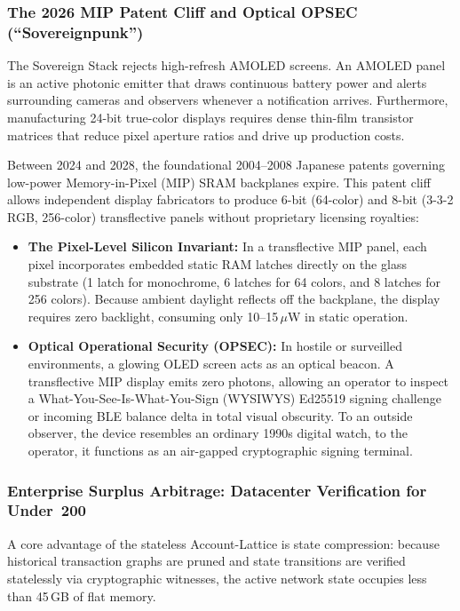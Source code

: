 \documentclass[a4paper,11pt,twoside,parskip=half-,headings=small]{scrartcl}
\newcommand{\EUR}[1]{\texteuro\,#1}
\begin{document}
\subsubsection{The 2026 MIP Patent Cliff and Optical OPSEC (``Sovereignpunk'')}
The Sovereign Stack rejects high-refresh AMOLED screens. An AMOLED panel is an active photonic emitter that draws continuous battery power and alerts surrounding cameras and observers whenever a notification arrives. Furthermore, manufacturing 24-bit true-color displays requires dense thin-film transistor matrices that reduce pixel aperture ratios and drive up production costs.

Between 2024 and 2028, the foundational 2004--2008 Japanese patents governing low-power Memory-in-Pixel (MIP) SRAM backplanes expire. This patent cliff allows independent display fabricators to produce 6-bit (64-color) and 8-bit (3-3-2 RGB, 256-color) transflective panels without proprietary licensing royalties:
\begin{itemize}
  \item \textbf{The Pixel-Level Silicon Invariant:} In a transflective MIP panel, each pixel incorporates embedded static RAM latches directly on the glass substrate (1 latch for monochrome, 6 latches for 64 colors, and 8 latches for 256 colors). Because ambient daylight reflects off the backplane, the display requires zero backlight, consuming only 10--15\,$\mu$W in static operation.
  \item \textbf{Optical Operational Security (OPSEC):} In hostile or surveilled environments, a glowing OLED screen acts as an optical beacon. A transflective MIP display emits zero photons, allowing an operator to inspect a What-You-See-Is-What-You-Sign (WYSIWYS) Ed25519 signing challenge or incoming BLE balance delta in total visual obscurity. To an outside observer, the device resembles an ordinary 1990s digital watch, to the operator, it functions as an air-gapped cryptographic signing terminal.
\end{itemize}

\subsubsection{Enterprise Surplus Arbitrage: Datacenter Verification for Under \EUR{200}}
A core advantage of the stateless Account-Lattice is state compression: because historical transaction graphs are pruned and state transitions are verified statelessly via cryptographic witnesses, the active network state occupies less than 45\,GB of flat memory.
\end{document}
